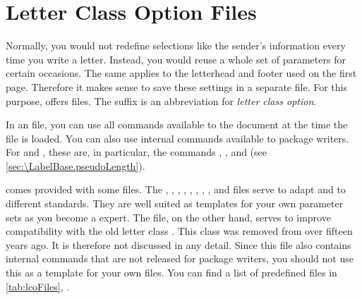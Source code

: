 

\section{Letter Class Option Files}
%
\BeginIndexGroup
{}%
%

Normally, you would not redefine selections like the sender's information
every time you write a letter. Instead, you would reuse a whole set of
parameters for certain occasions. The same applies to the letterhead
and footer used on the first page. Therefore it makes sense to save these
settings in a separate file. For this purpose, \KOMAScript{} offers
 files. The  suffix is an abbreviation for
\emph{\emph{l}etter \emph{c}lass \emph{o}ption}.

In an  file, you can use all commands available to the document at
the time the  file is loaded. You can also use internal commands
available to package writers. For  and ,
these are, in particular, the commands
,
, and
 (see
\autoref{sec:\LabelBase.pseudoLength}).

\KOMAScript{} comes provided with some  files. The ,
,
,
, ,
, , , and
 files serve to adapt
 and  to different standards. They are well
suited as templates for your own parameter sets as you become a \KOMAScript{}
expert. The  file, on the other hand, serves to improve
compatibility with the old letter class . This class was
removed from \KOMAScript{} over fifteen years ago. It is therefore not
discussed in any detail. Since this file also contains internal commands that
are not released for package writers, you should not use this as a template
for your own  files. You can find a list of predefined 
files in \autoref{tab:lcoFiles}, .

